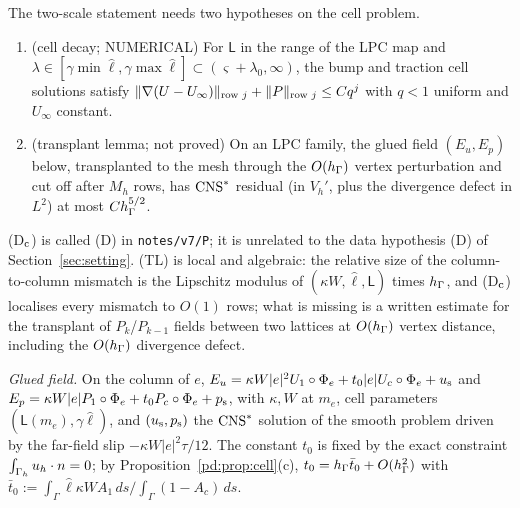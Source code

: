 The two-scale statement needs two hypotheses on the cell problem.
\begin{enumerate}
\item[(D$_{\rm c}$)] (cell decay; NUMERICAL) For $\mathsf L$ in the range of the LPC map and $\lambda\in[\gamma\min\hat\ell,\gamma\max\hat\ell]\subset(\varsigma+\lambda_0,\infty)$, the bump and traction cell solutions satisfy $\lVert \nabla(U-U_\infty)\rVert_{\text{row }j}+\lVert P\rVert_{\text{row }j}\le Cq^j$ with $q<1$ uniform and $U_\infty$ constant.
\item[(TL)] (transplant lemma; not proved) On an LPC family, the glued field $(E_u,E_p)$ below, transplanted to the mesh through the $O(h_\Gamma)$ vertex perturbation and cut off after $M_h$ rows, has $\mathrm{CNS}^\ast$ residual (in $V_h'$, plus the divergence defect in $L^2$) at most $Ch_\Gamma^{5/2}$.
\end{enumerate}
(D$_{\rm c}$) is called (D) in \texttt{notes/v7/P}; it is unrelated to the data hypothesis (D) of Section~\ref{sec:setting}. (TL) is local and algebraic: the relative size of the column-to-column mismatch is the Lipschitz modulus of $(\kappa W,\hat\ell,\mathsf L)$ times $h_\Gamma$, and (D$_{\rm c}$) localises every mismatch to $O(1)$ rows; what is missing is a written estimate for the transplant of $P_k$/$P_{k-1}$ fields between two lattices at $O(h_\Gamma)$ vertex distance, including the $O(h_\Gamma)$ divergence defect.

\emph{Glued field.} On the column of $e$, $E_u=\kappa W|e|^2U_1\circ\Phi_e+t_0|e|U_c\circ\Phi_e+u_{\rm s}$ and $E_p=\kappa W|e|P_1\circ\Phi_e+t_0P_c\circ\Phi_e+p_{\rm s}$, with $\kappa,W$ at $m_e$, cell parameters $(\mathsf L(m_e),\gamma\hat\ell)$, and $(u_{\rm s},p_{\rm s})$ the $\mathrm{CNS}^\ast$ solution of the smooth problem driven by the far-field slip $-\kappa W|e|^2\tau/12$. The constant $t_0$ is fixed by the exact constraint $\int_{\Gamma_h}u_h\cdot n=0$; by Proposition~\ref{pd:prop:cell}(c), $t_0=h_\Gamma\bar t_0+O(h_\Gamma^2)$ with $\bar t_0:=\int_\Gamma\hat\ell\kappa WA_1\,ds/\int_\Gamma(1-A_c)\,ds$.

